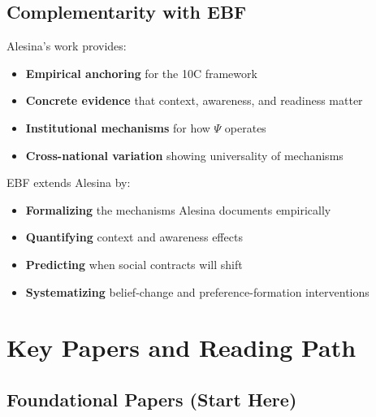 \subsection{Complementarity with EBF}

Alesina's work provides:
\begin{itemize}
\item \textbf{Empirical anchoring} for the 10C framework
\item \textbf{Concrete evidence} that context, awareness, and readiness matter
\item \textbf{Institutional mechanisms} for how $\Psi$ operates
\item \textbf{Cross-national variation} showing universality of mechanisms
\end{itemize}

EBF extends Alesina by:
\begin{itemize}
\item \textbf{Formalizing} the mechanisms Alesina documents empirically
\item \textbf{Quantifying} context and awareness effects
\item \textbf{Predicting} when social contracts will shift
\item \textbf{Systematizing} belief-change and preference-formation interventions
\end{itemize}

\clearpage


\section{Key Papers and Reading Path}
\label{sec:alesina-reading}

\subsection{Foundational Papers (Start Here)}

